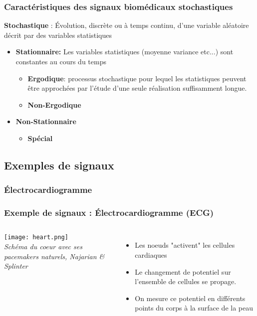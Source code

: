 \documentclass{beamer}
\begin{document}
\begin{frame}
\frametitle{Caractéristiques des signaux biomédicaux stochastiques}
\textbf{Stochastique} :  \'Evolution, discrète ou à temps continu, d'une variable aléatoire décrit par des variables statistiques
\vspace{0.2cm}
\begin{itemize}
\item \textbf{Stationnaire:} Les variables statistiques (moyenne variance etc...) sont constantes au cours du temps 
\vspace{0.1cm}
\begin{itemize}
 \item \textbf{Ergodique}:  processus stochastique pour lequel les statistiques peuvent être approchées par l'étude d'une seule réalisation suffisamment longue. 
 \vspace{0.1cm}
 \item \textbf{Non-Ergodique}
\end{itemize}
\vspace{0.2cm}
\item \textbf{Non-Stationnaire}
\vspace{0.1cm}
\begin{itemize}
 \item \textbf{Spécial}
\end{itemize}
\end{itemize}
\end{frame}

\subsection{Exemples de signaux}
\subsubsection{\'Electrocardiogramme}
\begin{frame}
\frametitle{Exemple de signaux : \'Electrocardiogramme (ECG) }
\begin{columns}
\column{60mm}
\texttt{[image: heart.png]}\\
\textit{\footnotesize Schéma du coeur avec ses pacemakers naturels, Najarian \& Splinter}
\column{60mm}
\begin{itemize}
\item Les noeuds "activent" les cellules cardiaques
\vspace{0.5cm}
\item Le changement de potentiel sur l'ensemble de cellules se propage. 
\vspace{0.3cm}
\item On mesure ce potentiel en différents points du corps à la surface de la peau 
\end{itemize}
\end{columns}
\end{frame}
\end{document}
